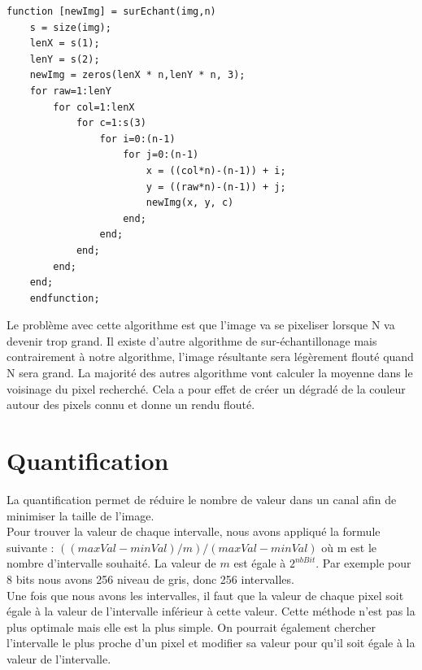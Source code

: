 \documentclass[a4paper,11pt]{article}
\begin{document}
  \begin{lstlisting}[caption=Fonction permettant le sur-échantillonnement d'une image]
    function [newImg] = surEchant(img,n)
    s = size(img);
    lenX = s(1);
    lenY = s(2);
    newImg = zeros(lenX * n,lenY * n, 3);
    for raw=1:lenY
        for col=1:lenX
            for c=1:s(3)
                for i=0:(n-1)
                    for j=0:(n-1)
                        x = ((col*n)-(n-1)) + i;
                        y = ((raw*n)-(n-1)) + j;
                        newImg(x, y, c)
                    end;
                end;
            end;
        end;
    end;
    endfunction;
  \end{lstlisting}
  
  Le problème avec cette algorithme est que l'image va se pixeliser lorsque N va devenir trop grand. Il existe 
  d'autre algorithme de sur-échantillonage mais contrairement à notre algorithme, l'image résultante sera légèrement flouté quand N sera grand.
  La majorité des autres algorithme vont calculer la moyenne dans le voisinage du pixel recherché. Cela a pour 
  effet de créer un dégradé de la couleur autour des pixels connu et donne un rendu flouté.
  
  
  \section{Quantification}
  La quantification permet de réduire le nombre de valeur dans un canal afin de minimiser la taille de l'image.\\
  
  Pour trouver la valeur de chaque intervalle, nous avons appliqué la formule suivante : $((maxVal - minVal) / m) / (maxVal - minVal)$
  où m est le nombre d'intervalle souhaité. La valeur de $m$ est égale à $2^{nbBit}$. Par exemple pour 8 bits nous avons 256 
  niveau de gris, donc 256 intervalles.\\
  
  Une fois que nous avons les intervalles, il faut que la valeur de chaque pixel soit égale à la valeur de l'intervalle 
  inférieur à cette valeur. Cette méthode n'est pas la plus optimale mais elle est la plus simple. On pourrait également 
  chercher l'intervalle le plus proche d'un pixel et modifier sa valeur pour qu'il soit égale à la valeur de l'intervalle.
  
\end{document}
